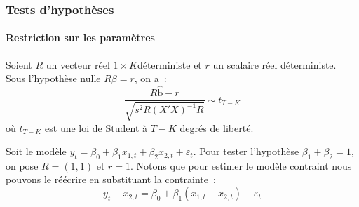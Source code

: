 \documentclass[10pt]{beamer}
\theoremstyle{plain}
\begin{document}
\begin{frame}
  \frametitle{Tests d'hypothèses}
  \framesubtitle{Restriction sur les paramètres}

  \begin{theorem}\label{thm:test:single_linear_restriction}
    Soient $R$ un vecteur réel $1\times K$déterministe et $r$ un scalaire réel déterministe. Sous l'hypothèse nulle $R\beta = r$, on a~:
    \[
      \frac{R\hat{\mathrm b}-r}{\sqrt{s^2R(X'X)^{-1}R}} \sim t_{T-K}
    \]
    où $t_{T-K}$ est une loi de Student à $T-K$ degrés de liberté.
  \end{theorem}

  \bigskip

  \begin{example}
    Soit le modèle $y_t = \beta_0 + \beta_1 x_{1,t} + \beta_2 x_{2,t} + \varepsilon_t$. Pour tester l'hypothèse $\beta_1+\beta_2=1$, on pose $R = (1, 1)$ et $r=1$. Notons que pour estimer le modèle contraint nous pouvons le réécrire en substituant la contrainte~:
    \[
      y_t-x_{2,t} = \beta_0 + \beta_1\left( x_{1,t}-x_{2,t} \right) + \varepsilon_t
    \]
  \end{example}

\end{frame}
\end{document}
